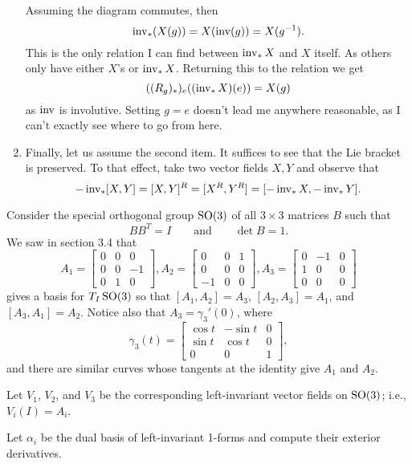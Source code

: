 \documentclass[12pt]{memoir}
\begin{document}
\begin{ptcbr}
\begin{enumerate}
\begin{center}
\begin{tikzcd}
	\end{tikzcd}
		\end{center}
		Assuming the diagram commutes, then 
		$$\inv_\ast(X(g))=X(\inv(g))=X(g^{-1}).$$
		This is the only relation I can find between $\inv_\ast X$ and $X$ itself. As others only have either $X$'s or $\inv_\ast X$. Returning this to the relation we get
		$$((R_g)_\ast)_e((\inv_\ast X)(e))=X(g)$$
		as $\inv$ is involutive. Setting $g=e$ doesn't lead me anywhere reasonable, as I can't exactly see where to go from here. 
		\item Finally, let us assume the second item. It suffices to see that the Lie bracket is preserved. To that effect, take two vector fields $X,Y$ and observe that 
		$$-\inv_\ast[X,Y]=[X,Y]^R=[X^R,Y^R]=[-\inv_\ast X,-\inv_\ast Y].$$
	\end{enumerate}
\end{ptcbr}
\begin{Ej}
    Consider the special orthogonal group $\SO(3)$ of all $3 \times 3$ matrices $B$ such that 
	\[
		B B^T = I \qquad \text{and} \qquad \det B = 1.
	\]
	We saw in section 3.4 that
	\[
		A_1 = \begin{bmatrix} 0 & 0 & 0 \\ 0 & 0 & -1 \\ 0 & 1 & 0 \end{bmatrix}, A_2 = \begin{bmatrix} 0 & 0 & 1 \\ 0 & 0 & 0 \\ -1 & 0 & 0 \end{bmatrix}, A_3 = \begin{bmatrix} 0 & -1 & 0 \\ 1 & 0 & 0 \\ 0 & 0 & 0 \end{bmatrix}
	\]
	gives a basis for $T_I\SO(3)$ so that $[A_1, A_2]=A_3$, $[A_2,A_3]=A_1$, and $[A_3,A_1]=A_2$. Notice also that $A_3 = \gamma_3'(0)$, where
	\[
		\gamma_3(t) = \begin{bmatrix} \cos t & -\sin t & 0 \\ \sin t & \cos t & 0 \\ 0 & 0 & 1 \end{bmatrix},
	\]
	and there are similar curves whose tangents at the identity give $A_1$ and $A_2$.
	
	Let $V_1$, $V_2$, and $V_3$ be the corresponding left-invariant vector fields on $\SO(3)$; i.e., $V_i(I)=A_i$.
	
	Let $\alpha_i$ be the dual basis of left-invariant 1-forms and compute their exterior derivatives. 
\end{Ej}
\end{document}
